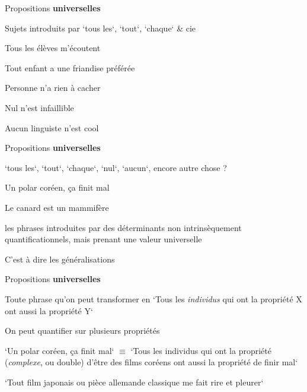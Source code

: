 \begin{frame}
	Propositions \textbf{universelles}
	
		\begin{description}[labelindent=6pt,style=multiline,leftmargin=1.3in]
		 \setlength\itemsep{1em}
\item[En gros] Sujets introduits par `tous les`, `tout`, `chaque` \& cie\pause
\item[Exemples] Tous les élèves m'écoutent\pause
\item[] Tout enfant a une friandise préférée\pause
\pause \pause
\item[] Personne n'a rien à cacher \pause
\item[] Nul n'est infaillible\pause
\item[] Aucun linguiste n'est cool
	\end{description}
\end{frame}


\begin{frame}
	Propositions \textbf{universelles}
	
		\begin{description}[labelindent=6pt,style=multiline,leftmargin=1.3in]
		 \setlength\itemsep{1em}
\item[En gros] `tous les`, `tout`, `chaque`, `nul`, `aucun`\pause, encore autre chose ?\pause
\item[Exemples] Un polar coréen, ça finit mal \pause
\item[] Le canard est un mammifère\pause
\item[A rajouter] les phrases introduites par des déterminants non intrinsèquement quantificationnels, mais prenant une valeur universelle\pause
\item[] C'est à dire les généralisations
	\end{description}
\end{frame}


\begin{frame}
	Propositions \textbf{universelles}
	
		\begin{description}[labelindent=6pt,style=multiline,leftmargin=1.3in]
		 \setlength\itemsep{1em}
\item[Intuition] Toute phrase qu'on peut transformer en `Tous les \textit{individus} qui ont la propriété X ont aussi la propriété Y`
\item[Remarque] On peut quantifier sur plusieurs propriétés\pause 
\item[] `Un polar coréen, ça finit mal` $\equiv$ `Tous les individus qui ont la propriété (\textit{complexe}, ou double) d'être des films coréens ont aussi la propriété de finir mal`\pause
\item[Exemple] `Tout film japonais ou pièce allemande classique me fait rire et pleurer`
	\end{description}
\end{frame}

